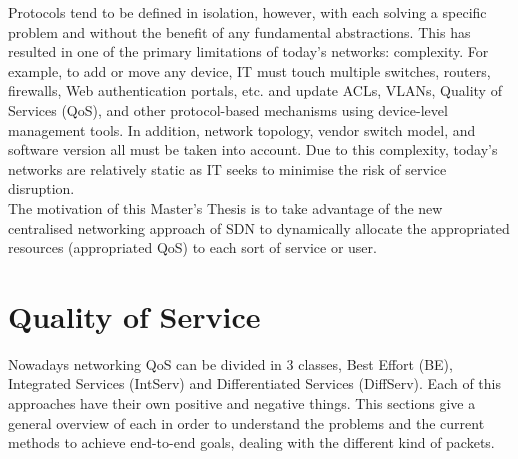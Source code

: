 
Protocols tend to be defined in isolation, however, with each solving a specific problem and without the benefit of any fundamental abstractions. This has resulted in one of the primary limitations of today's networks: complexity. For example, to add or move any device, IT must touch 
multiple switches, routers, firewalls, Web authentication portals, etc. and update ACLs, VLANs, Quality of Services (QoS), and other protocol-based mechanisms using device-level management tools. In addition, network topology, vendor switch model, and software version all must be taken into 
account. Due to this complexity, today's networks are relatively static as IT seeks to minimise the risk of service disruption.\\

The motivation of this Master's Thesis is to take advantage of the new centralised networking approach of SDN to dynamically allocate the appropriated resources (appropriated QoS) to each sort of service or user.    





\section{Quality of Service}
\label{sec:qos}

Nowadays networking QoS can be divided in 3 classes, Best Effort (BE), Integrated Services (IntServ) and Differentiated Services (DiffServ). Each of this approaches have their own positive and negative things. This sections give a general overview of each in order to understand the problems and the current methods to achieve end-to-end goals, dealing with the different kind of packets.\\ 

